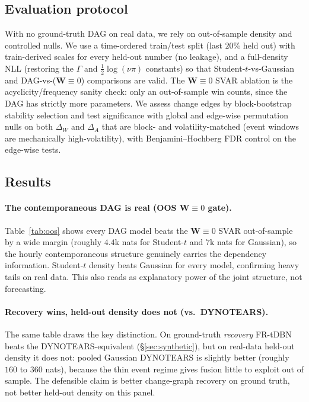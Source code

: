 \documentclass{article}
\newcommand{\W}{\bm{W}}
\newcommand{\Wd}{\Delta_{\!W}}
\newcommand{\Ad}{\Delta_{\!A}}
\begin{document}
\subsection{Evaluation protocol}
\label{sec:eval}
With no ground-truth DAG on real data, we rely on out-of-sample density and controlled
nulls. We use a time-ordered train/test split (last $20\%$ held out) with
train-derived scales for every held-out number (no leakage), and a full-density
NLL (restoring the $\Gamma$ and $\tfrac12\log(\nu\pi)$ constants) so that
Student-$t$-vs-Gaussian and DAG-vs-($\W\!\equiv\!0$) comparisons are valid. The
$\W\!\equiv\!0$ SVAR ablation is the acyclicity/frequency sanity check: only an
out-of-sample win counts, since the DAG has strictly more parameters. We assess
change edges by block-bootstrap stability selection
\citep{meinshausen2010stability} and test significance with global and
edge-wise permutation nulls on both $\Wd$ and $\Ad$ that are block- and
volatility-matched (event windows are mechanically high-volatility), with
Benjamini--Hochberg FDR control \citep{benjamini1995fdr} on the edge-wise tests.

\subsection{Results}

\paragraph{The contemporaneous DAG is real (OOS $\W\!\equiv\!0$ gate).}
Table~\ref{tab:oos} shows every DAG model beats the $\W\!\equiv\!0$ SVAR
out-of-sample by a wide margin (roughly $4.4$k nats for Student-$t$ and $7$k
nats for Gaussian), so the hourly contemporaneous structure genuinely carries the
dependency information. Student-$t$ density beats Gaussian for every model, confirming
heavy tails on real data. This also reads as explanatory power of the joint structure,
not forecasting.

\paragraph{Recovery wins, held-out density does not (vs.\ DYNOTEARS).}
The same table draws the key distinction. On ground-truth \emph{recovery} FR-tDBN beats
the DYNOTEARS-equivalent (\S\ref{sec:synthetic}), but on real-data held-out density it
does not: pooled Gaussian DYNOTEARS is slightly better (roughly $160$ to $360$ nats),
because the thin event regime gives fusion little to exploit out of sample. The
defensible claim is better change-graph recovery on ground truth, not better held-out
density on this panel.
\end{document}
